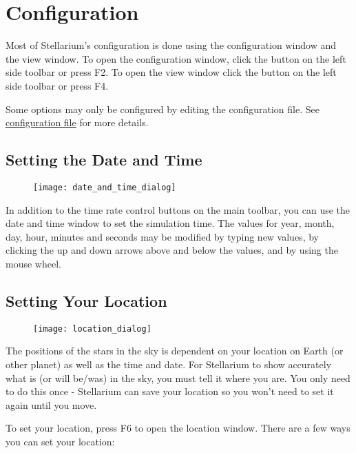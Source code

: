 
\chapter{Configuration}

Most of Stellarium's configuration is done using the configuration
window and the view window. To open the configuration window, click the
button on the left side toolbar or press F2. To open the view window
click the button on the left side toolbar or press F4.

Some options may only be configured by editing the configuration file.
See \href{Advanced_Use\#The_Main_Configuration_File}{ configuration
file} for more details.

\section{Setting the Date and Time}\label{setting-the-date-and-time}

\begin{figure}[h]
\centering\texttt{[image: date\_and\_time\_dialog]}
\end{figure}

In addition to the time rate control buttons on the main toolbar, you
can use the date and time window to set the simulation time. The values
for year, month, day, hour, minutes and seconds may be modified by
typing new values, by clicking the up and down arrows above and below
the values, and by using the mouse wheel.

\section{Setting Your Location}\label{setting-your-location}

\begin{figure}[h]
\centering\texttt{[image: location\_dialog]}
\end{figure}

The positions of the stars in the sky is dependent on your location on
Earth (or other planet) as well as the time and date. For Stellarium to
show accurately what is (or will be/was) in the sky, you must tell it
where you are. You only need to do this once - Stellarium can save your
location so you won't need to set it again until you move.

To set your location, press F6 to open the location window. There are a
few ways you can set your location:

